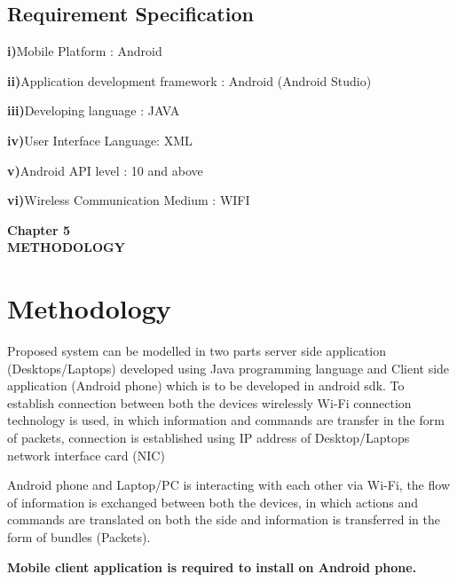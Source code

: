 \documentclass[12pt]{article}
\begin{document}
 \subsection{Requirement Specification }\par
 \hspace{6.5mm}\textbf{i)}Mobile Platform : Android \par
\textbf{ii)}Application development framework : Android (Android Studio) \par
\textbf{iii)}Developing language : JAVA \par
\textbf{iv)}User Interface Language: XML\par
\textbf{v)}Android API level : 10 and above\par
\textbf{vi)}Wireless Communication Medium : WIFI\par 



\clearpage

\begin{center}
 \LARGE \textbf {Chapter 5 }\\[10mm]
 \Large \textbf{METHODOLOGY }\\[10mm]
 \end{center}
 \section{Methodology }
Proposed system can be modelled in two parts server side application
(Desktops/Laptops) developed using Java programming language and Client side
application (Android phone) which is to be developed in android sdk. To establish
connection between both the devices wirelessly Wi-Fi connection technology is
used, in which information and commands are transfer in the form of packets,
connection is established using IP address of Desktop/Laptops network interface
card (NIC)\par
Android phone and Laptop/PC is interacting with each other via Wi-Fi, the flow of
information is exchanged between both the devices, in which actions and
commands are translated on both the side and information is transferred in the
form of bundles (Packets).\\[5mm]\par
\textbf{Mobile client application is required to install on Android phone.}
 
\end{document}
